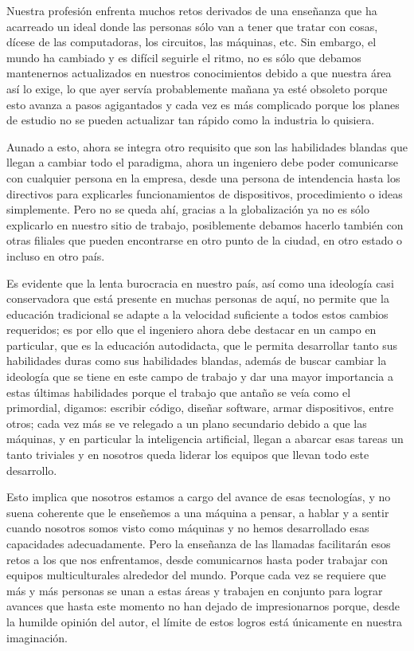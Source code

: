 
Nuestra profesión enfrenta muchos retos derivados de una enseñanza que ha acarreado un ideal donde las personas sólo van a tener que tratar con cosas, dícese de las computadoras, los circuitos, las máquinas, etc. Sin embargo, el mundo ha cambiado y es difícil seguirle el ritmo, no es sólo que debamos mantenernos actualizados en nuestros conocimientos debido a que nuestra área así lo exige, lo que ayer servía probablemente mañana ya esté obsoleto porque esto avanza a pasos agigantados y cada vez es más complicado porque los planes de estudio no se pueden actualizar tan rápido como la industria lo quisiera. 
\vspace{5mm}

\noindent Aunado a esto, ahora se integra otro requisito que son las habilidades blandas que llegan a cambiar todo el paradigma, ahora un ingeniero debe poder comunicarse con cualquier persona en la empresa, desde una persona de intendencia hasta los directivos para explicarles funcionamientos de dispositivos, procedimiento o ideas simplemente. Pero no se queda ahí, gracias a la globalización ya no es sólo explicarlo en nuestro sitio de trabajo, posiblemente debamos hacerlo también con otras filiales que pueden encontrarse en otro punto de la ciudad, en otro estado o incluso en otro país. 
\vspace{5mm}

\noindent Es evidente que la lenta burocracia en nuestro país, así como una ideología casi conservadora que está presente en muchas personas de aquí, no permite que la educación tradicional se adapte a la velocidad suficiente a todos estos cambios requeridos; es por ello que el ingeniero ahora debe destacar en un campo en particular, que es la educación autodidacta, que le permita desarrollar tanto sus habilidades duras como sus habilidades blandas, además de buscar cambiar la ideología que se tiene en este campo de trabajo y dar una mayor importancia a estas últimas habilidades porque el trabajo que antaño se veía como el primordial, digamos: escribir código, diseñar software, armar dispositivos, entre otros; cada vez más se ve relegado a un plano secundario debido a que las máquinas, y en particular la inteligencia artificial, llegan a abarcar esas tareas un tanto triviales y en nosotros queda liderar los equipos que llevan todo este desarrollo.
\vspace{5mm}

\noindent Esto implica que nosotros estamos a cargo del avance de esas tecnologías, y no suena coherente que le enseñemos a una máquina a pensar, a hablar y a sentir cuando nosotros somos visto como máquinas y no hemos desarrollado esas capacidades adecuadamente. Pero la enseñanza de las llamadas  facilitarán esos retos a los que nos enfrentamos, desde comunicarnos hasta poder trabajar con equipos multiculturales alrededor del mundo. Porque cada vez se requiere que más y más personas se unan a estas áreas y trabajen en conjunto para lograr avances que hasta este momento no han dejado de impresionarnos porque, desde la humilde opinión del autor, el límite de estos logros está únicamente en nuestra imaginación.
